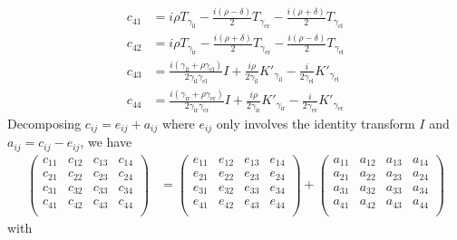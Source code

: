 \begin{align*}
  c_{41} &= i \rho T_{\gamma_\text{il}}- \frac{i(\rho-\delta)}{2} T_{\gamma_\text{er}} - \frac{i(\rho+\delta)}{2} T_{\gamma_\text{el}} \\
  c_{42} &= i \rho T_{\gamma_\text{ir}}-\frac{i(\rho+\delta)}{2} T_{\gamma_\text{er}}- \frac{i(\rho-\delta)}{2} T_{\gamma_\text{el}} \\
  c_{43} &= \frac{i(\gamma_\text{il} + \rho\gamma_\text{el})}{2 \gamma_\text{il}\gamma_\text{el}} I+\frac{i \rho}{2 \gamma_\text{il}} K'_{\gamma_\text{il}} - \frac{i}{2 \gamma_\text{el}} K'_{\gamma_\text{el}} \\
  c_{44} &= \frac{i(\gamma_\text{ir} + \rho\gamma_\text{er})}{2 \gamma_\text{ir}\gamma_\text{er}} I+ \frac{i\rho}{2 \gamma_\text{ir}} K'_{\gamma_\text{ir}} - \frac{i}{2 \gamma_\text{er}} K'_{\gamma_\text{er}}
\end{align*}
Decomposing $c_{ij} = e_{ij} + a_{ij}$ where $e_{ij}$ only involves the identity transform $I$ and $a_{ij}=c_{ij}-e_{ij}$, we have
\begin{align*}
  \begin{pmatrix}
    c_{11} & c_{12} & c_{13} & c_{14} \\
    c_{21} & c_{22} & c_{23} & c_{24} \\
    c_{31} & c_{32} & c_{33} & c_{34} \\
    c_{41} & c_{42} & c_{43} & c_{44} \\
  \end{pmatrix} &=
  \begin{pmatrix}
    e_{11} & e_{12} & e_{13} & e_{14} \\
    e_{21} & e_{22} & e_{23} & e_{24} \\
    e_{31} & e_{32} & e_{33} & e_{34} \\
    e_{41} & e_{42} & e_{43} & e_{44} \\
  \end{pmatrix} + 
  \begin{pmatrix}
    a_{11} & a_{12} & a_{13} & a_{14} \\
    a_{21} & a_{22} & a_{23} & a_{24} \\
    a_{31} & a_{32} & a_{33} & a_{34} \\
    a_{41} & a_{42} & a_{43} & a_{44} \\
  \end{pmatrix} 
\end{align*}
with
